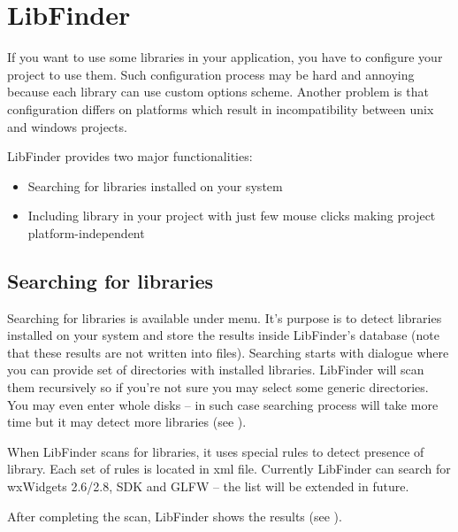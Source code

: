 \section{LibFinder}\label{sec:lib_finder}

If you want to use some libraries in your application, you have to configure your project to use them. Such configuration process may be hard and annoying because each library can use custom options scheme. Another problem is that configuration differs on platforms which result in incompatibility between unix and windows projects.

LibFinder provides two major functionalities:

\begin{itemize}
\item Searching for libraries installed on your system
\item Including library in your project with just few mouse clicks making project platform-independent
\end{itemize}

\subsection{Searching for libraries}

Searching for libraries is available under  menu. It's purpose is to detect libraries installed on your system and store the results inside LibFinder's database (note that these results are not written into \codeblocks files). Searching starts with dialogue where you can provide set of directories with installed libraries. LibFinder will scan them recursively so if you're not sure you may select some generic directories. You may even enter whole disks -- in such case searching process will take more time but it may detect more libraries (see ).


When LibFinder scans for libraries, it uses special rules to detect presence of library. Each set of rules is located in xml file. Currently LibFinder can search for wxWidgets 2.6/2.8, \codeblocks SDK and GLFW -- the list will be extended in future.


After completing the scan, LibFinder shows the results (see ).

